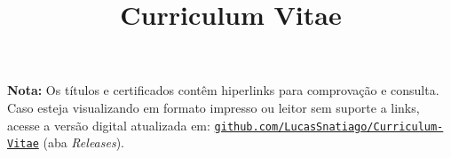 \documentclass[a4paper,skipsamekey,11pt,english]{curve}
\title{Curriculum Vitae}
\begin{document}
\makeheaders[c]

\textbf{Nota:} Os títulos e certificados contêm hiperlinks para comprovação e consulta.
Caso esteja visualizando em formato impresso ou leitor sem suporte a links, acesse a versão digital atualizada em: \href{https://github.com/LucasSnatiago/Curriculum-Vitae}{\texttt{github.com/LucasSnatiago/Curriculum-Vitae}} (aba \emph{Releases}).






% 
\end{document}
